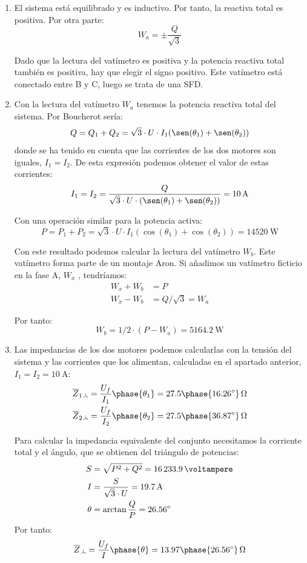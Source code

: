 \begin{enumerate}
\item El sistema está equilibrado y es inductivo. Por tanto, la reactiva total es positiva. Por otra parte:
  \[
    W_a = \pm \frac{Q}{\sqrt{3}}
  \]

  Dado que la lectura del vatímetro es positiva y la potencia reactiva total también es positiva, hay que elegir el signo positivo. Este vatímetro está conectado entre B y C, luego se trata de una SFD.
  
\item Con la lectura del vatímetro $W_a$ tenemos la potencia reactiva total del sistema. Por Boucherot sería:
  \[
    Q = Q_1 + Q_2 = \sqrt{3} \cdot U \cdot I_1 (\sen(\theta_1) + \sen(\theta_2))
  \]
  donde se ha tenido en cuenta que las corrientes de los dos motores son iguales, $I_1 = I_2$. De esta expresión podemos obtener el valor de estas corrientes:
  \[
    I_1 = I_2 = \frac{Q}{\sqrt{3} \cdot U \cdot (\sen(\theta_1) + \sen(\theta_2))} = \qty{10}{\ampere}
  \]

  Con una operación similar para la potencia activa:
  \[
    P = P_1 + P_2 = \sqrt{3} \cdot U \cdot I_1 (\cos(\theta_1) + \cos(\theta_2)) = \qty{14520}{\watt}
  \]

  Con este resultado podemos calcular la lectura del vatímetro $W_b$. Este vatímetro forma parte de un montaje Aron. Si añadimos un vatímetro ficticio en la fase A, $W_x$ , tendríamos:
  \begin{align*}
    W_x + W_b &= P\\
    W_x - W_b &= Q/\sqrt{3} = W_a
  \end{align*}

  Por tanto:
  \[
    W_b = 1/2 \cdot (P - W_a) = \qty{5164.2}{\watt}
  \]
  
\item Las impedancias de los dos motores podemos calcularlas con la tensión del sistema y las corrientes que los alimentan, calculadas en el apartado anterior, $I_1 = I_2 = \qty{10}{\ampere}$:
    \begin{align*}
      \overline{Z}_{1\wye} &= \frac{U_f}{I_1}\phase{\theta_1} = 27.5\phase{\ang{16.26}}\,\unit{\ohm}\\
      \overline{Z}_{2\wye} &= \frac{U_f}{I_2}\phase{\theta_2} = 27.5\phase{\ang{36.87}}\,\unit{\ohm}
  \end{align*}

  Para calcular la impedancia equivalente del conjunto necesitamos la corriente total y el ángulo, que se obtienen del triángulo de potencias:
  \begin{align*}
    S &= \sqrt{P^2 + Q^2} = \qty{16233.9}{\voltampere}\\
    I &= \frac{S}{\sqrt{3} \cdot U} = \qty{19.7}{\ampere}\\
    \theta &= \arctan{\frac{Q}{P}} = \ang{26.56}
  \end{align*}
  Por tanto:
  \[
    \overline{Z}_{\wye} = \frac{U_f}{I}\phase{\theta} = 13.97\phase{\ang{26.56}}\,\unit{\ohm}
  \]


\end{enumerate}
